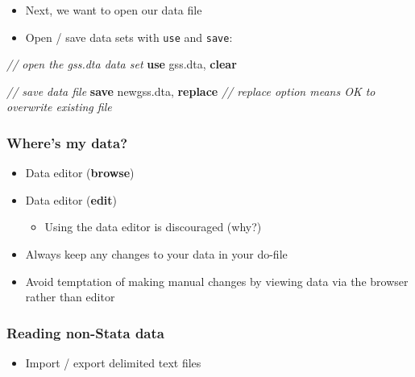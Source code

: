 \documentclass[
]{book}
\newenvironment{Shaded}{\begin{snugshade}}{\end{snugshade}}
\newcommand{\CommentTok}[1]{\textcolor[rgb]{0.56,0.35,0.01}{\textit{#1}}}
\newcommand{\KeywordTok}[1]{\textcolor[rgb]{0.13,0.29,0.53}{\textbf{#1}}}
\newcommand{\NormalTok}[1]{#1}
\providecommand{\tightlist}{%
  \setlength{\itemsep}{0pt}\setlength{\parskip}{0pt}}
\begin{document}
\begin{itemize}
\tightlist
\item
  Next, we want to open our data file
\item
  Open / save data sets with \texttt{use} and \texttt{save}:
\end{itemize}

\begin{Shaded}
\begin{Highlighting}[]
\CommentTok{// open the gss.dta data set }
\KeywordTok{use}\NormalTok{ gss.dta, }\KeywordTok{clear}

\CommentTok{// save data file}
\KeywordTok{save}\NormalTok{ newgss.dta, }\KeywordTok{replace} \CommentTok{// \textasciigrave{}replace\textasciigrave{} option means OK to overwrite existing file}
\end{Highlighting}
\end{Shaded}

\hypertarget{wheres-my-data}{%
\subsubsection{Where's my data?}\label{wheres-my-data}}

\begin{itemize}
\tightlist
\item
  Data editor (\textbf{browse})
\item
  Data editor (\textbf{edit})

  \begin{itemize}
  \tightlist
  \item
    Using the data editor is discouraged (why?)
  \end{itemize}
\item
  Always keep any changes to your data in your do-file
\item
  Avoid temptation of making manual changes by viewing data via the browser rather than editor
\end{itemize}

\hypertarget{reading-non-stata-data}{%
\subsubsection{Reading non-Stata data}\label{reading-non-stata-data}}

\begin{itemize}
\tightlist
\item
  Import / export delimited text files
\end{itemize}
\end{document}
